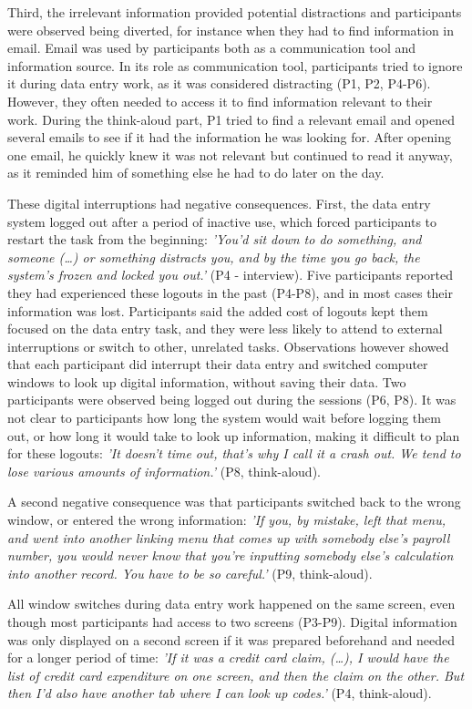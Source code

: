 Third, the irrelevant information provided potential distractions and participants were observed being diverted, for instance when they had to find information in email. Email was used by participants both as a communication tool and information source. In its role as communication tool, participants tried to ignore it during data entry work, as it was considered distracting (P1, P2, P4-P6). However, they often needed to access it to find information relevant to their work. During the think-aloud part, P1 tried to find a relevant email and opened several emails to see if it had the information he was looking for. After opening one email, he quickly knew it was not relevant but continued to read it anyway, as it reminded him of something else he had to do later on the day.

These digital interruptions had negative consequences. First, the data entry system logged out after a period of inactive use, which forced participants to restart the task from the beginning: \textit{'You’d sit down to do something, and someone (…) or something distracts you, and by the time you go back, the system’s frozen and locked you out.'} (P4 - interview). Five participants reported they had experienced these logouts in the past (P4-P8), and in most cases their information was lost. Participants said the added cost of logouts kept them focused on the data entry task, and they were less likely to attend to external interruptions or switch to other, unrelated tasks. Observations however showed that each participant did interrupt their data entry and switched computer windows to look up digital information, without saving their data. Two participants were observed being logged out during the sessions (P6, P8). It was not clear to participants how long the system would wait before logging them out, or how long it would take to look up information, making it difficult to plan for these logouts: \textit{'It doesn’t time out, that’s why I call it a crash out. We tend to lose various amounts of information.'} (P8, think-aloud). 

A second negative consequence was that participants switched back to the wrong window, or entered the wrong information: \textit{'If you, by mistake, left that menu, and went into another linking menu that comes up with somebody else’s payroll number, you would never know that you’re inputting somebody else’s calculation into another record. You have to be so careful.'} (P9, think-aloud).

All window switches during data entry work happened on the same screen, even though most participants had access to two screens (P3-P9). Digital information was only displayed on a second screen if it was prepared beforehand and needed for a longer period of time: \textit{'If it was a credit card claim, (…), I would have the list of credit card expenditure on one screen, and then the claim on the other. But then I’d also have another tab where I can look up codes.'} (P4, think-aloud).

